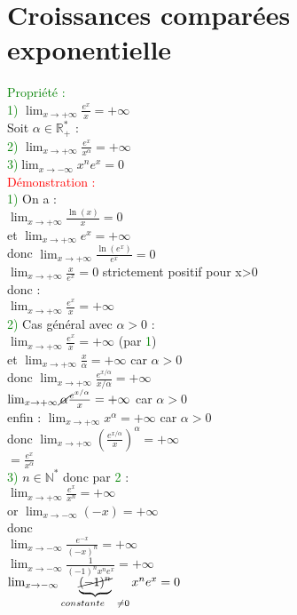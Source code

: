 \documentclass{article}
\begin{document}
 \section{Croissances comparées exponentielle}
 \textcolor{green}{Propriété :} \\
 \textcolor{green}{1)} $\lim_{x \rightarrow + \infty} \frac{e^x}{x}= +\infty$ \\
 Soit $\alpha \in \mathbb{R}^*_+$ : \\
 \textcolor{green}{2)} $\lim_{x \rightarrow + \infty} \frac{e^x}{x^\alpha}= +\infty$ \\
 \textcolor{green}{3)}$\lim_{x \rightarrow - \infty} x^n e^x=0$ \\
 \textcolor{red}{Démonstration :} \\
 \textcolor{green}{1)} On a : \\
 $\lim_{x \rightarrow + \infty} \frac{\ln(x)}{x}=0$ \\
 et $\lim_{x \rightarrow + \infty}e^x=+\infty$ \\
 donc $\lim_{x \rightarrow + \infty} \frac{\ln(e^x)}{e^x}=0$ \\
 $\lim_{x \rightarrow + \infty} \frac{x}{e^x}=0$ strictement positif pour x>0 \\
 donc : \\
 $\lim_{x \rightarrow + \infty} \frac{e^x}{x}= +\infty$ \\
 \textcolor{green}{2)} Cas général avec $\alpha > 0$ : \\
 $\lim_{x \rightarrow + \infty} \frac{e^x}{x}= + \infty$ (par \textcolor{green}{1}) \\
 et $\lim_{x \rightarrow + \infty}\frac{x}{\alpha}= + \infty$ car $\alpha > 0$ \\
 donc $\lim_{x \rightarrow + \infty} \frac{e^{x/\alpha}}{x /\alpha}=+ \infty$ \\
 $\lim_{x \rightarrow + \infty} \cancel{\alpha} \frac{e^{x/\alpha}}{x}= + \infty$ car $\alpha>0$ \\
 enfin : $ \lim_{x \rightarrow + \infty} x^\alpha= +\infty$ car $\alpha>0$ \\
 donc $\lim_{x \rightarrow + \infty}(\frac{e^{x/\alpha}}{x})^\alpha = + \infty$ \\
 \indent $= \frac{e^x}{x^\alpha}$ \\
 \textcolor{green}{3)} $n \in \mathbb{N}^*$ donc par \textcolor{green}{2} : \\
 $\lim_{x \rightarrow + \infty }\frac{e^x}{x^n}=+ \infty$ \\
 or $\lim_{x \rightarrow - \infty} (-x) = + \infty$ \\
 donc \\
 $\lim_{x \rightarrow - \infty} \frac{e^{-x}}{(-x)^n}=+ \infty$ \\
 $ \lim_{x \rightarrow - \infty} \frac{1}{(-1)^nx^ne^x}= + \infty$ \\
 $ \lim_{x \rightarrow - \infty} \underbrace{\cancel{(-1)^n}}_{constante \quad \neq 0} x^ne^x=0$
\end{document}

